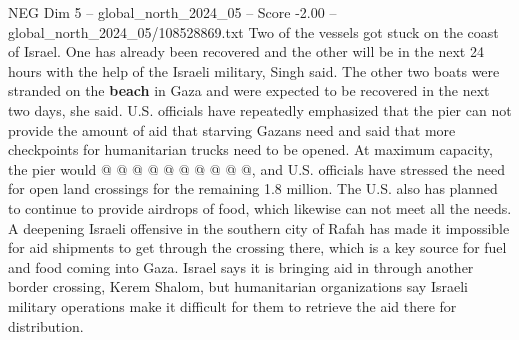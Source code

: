 \begin{textsample}{NEG Dim 5 – global\_north\_2024\_05 – Score -2.00 – global\_north\_2024\_05/108528869.txt}
Two of the vessels got stuck on the coast of Israel.
One has already been recovered and the other will be in the next 24 hours with the help of the Israeli military, Singh said.
The other two boats were stranded on the \textbf{beach} in Gaza and were expected to be recovered in the next two days, she said.
U.S. officials have repeatedly emphasized that the pier can not provide the amount of aid that starving Gazans need and said that more checkpoints for humanitarian trucks need to be opened.
At maximum capacity, the pier would @ @ @ @ @ @ @ @ @ @, and U.S. officials have stressed the need for open land crossings for the remaining 1.8 million.
The U.S. also has planned to continue to provide airdrops of food, which likewise can not meet all the needs.
A deepening Israeli offensive in the southern city of Rafah has made it impossible for aid shipments to get through the crossing there, which is a key source for fuel and food coming into Gaza.
Israel says it is bringing aid in through another border crossing, Kerem Shalom, but humanitarian organizations say Israeli military operations make it difficult for them to retrieve the aid there for distribution.

\end{textsample}

